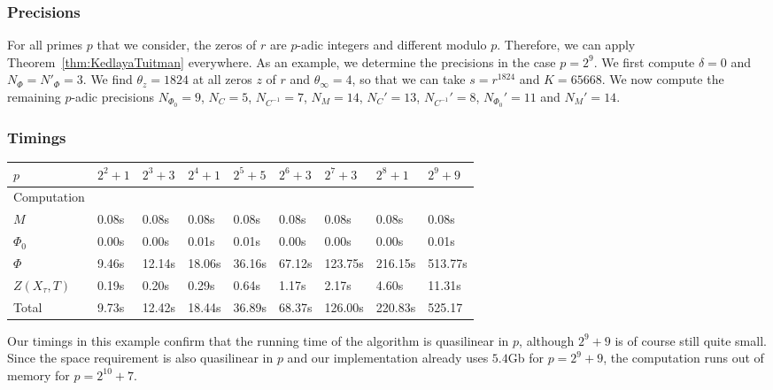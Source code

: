 \documentclass[a4paper,11pt]{article}
\numberwithin{equation}{section}
\theoremstyle{definition}
\begin{document}
\subsubsection{Precisions}

For all primes $p$ that we consider, the zeros of $r$ are $p$-adic integers and different modulo $p$.
Therefore, we can apply Theorem~\ref{thm:KedlayaTuitman} everywhere. As an example, we determine the
precisions in the case $p=2^9$. We first compute $\delta=0$ and $N_{\Phi}=N'_{\Phi}=3$. We find
$\theta_z=1824$ at all zeros $z$ of $r$ and $\theta_{\infty}=4$, so that we can take $s=r^{1824}$ and $K=65668$.
We now compute the remaining $p$-adic precisions $N_{\Phi_0}=9$, $N_C=5$, $N_{C^{-1}}=7$, $N_M=14$, 
$N_C'=13$, $N_{C^{-1}}'=8$, $N_{\Phi_0}'=11$ and $N_M'=14$.

\subsubsection{Timings}

\begin{center}
\begin{tabular}{l l l l l l l l l} \toprule
$p$             & $2^2+1$ & $2^3+3$ & $2^4+1$ & $2^5+5$ & $2^6+3$ & $2^7 + 3$ & $ 2^8+1$ & $2^9+9$	\\ \midrule
Computation     & 	  &         &         &                                                    	\\ \midrule  
$M$             & 0.08s   & 0.08s   & 0.08s   & 0.08s  	& 0.08s	  & 0.08s     & 0.08s	 & 0.08s	\\
$\Phi_0$        & 0.00s   & 0.00s   & 0.01s   & 0.01s 	& 0.00s	  & 0.00s     &	0.00s	 & 0.01s	\\
$\Phi$          & 9.46s   & 12.14s  & 18.06s  & 36.16s 	& 67.12s  & 123.75s   &	216.15s	 & 513.77s	\\
$Z(X_{\tau},T)$ & 0.19s   & 0.20s   & 0.29s   & 0.64s 	& 1.17s	  & 2.17s     & 4.60s	 & 11.31s	\\
Total           & 9.73s   & 12.42s  & 18.44s  & 36.89s 	& 68.37s  & 126.00s   &	220.83s	 & 525.17	\\ \bottomrule
\end{tabular} 
\end{center}

\bigskip

Our timings in this example confirm that the running time of the algorithm is quasilinear in $p$, although $2^9+9$ is
of course still quite small. Since the space requirement is also quasilinear in $p$ and our implementation already uses $5.4$Gb for 
$p=2^9+9$, the computation runs out of memory for $p=2^{10}+7$. 
\end{document}
